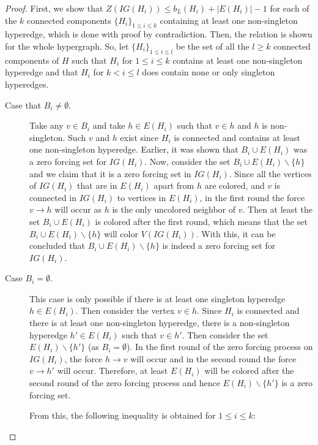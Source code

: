 \documentclass[10pt,a4paper]{amsart}
\begin{document}
\begin{proof}
    First, we show that $Z(IG(H_i)) \leq b_L(H_i) + |E(H_i)| - 1$ for each of the $k$ connected components $\{H_i\}_{1\leq i\leq k}$ containing at least one non-singleton hyperedge, which is done with proof by contradiction. Then, the relation is shown for the whole hypergraph.
    So, let $\{H_i\}_{1\leq i\leq l}$ be the set of all the $l\geq k$ connected components of $H$ such that $H_i$ for $1\leq i \leq k$ contains at least one non-singleton hyperedge and that $H_i$ for $k< i\leq l$ does contain none or only singleton hyperedges. 

    
\begin{description}
    \item[Case that $B_i\neq \emptyset$.] Take any $v\in B_i$ and take $h\in E(H_i)$ such that $v\in h$ and $h$ is non-singleton. Such $v$ and $h$ exist since $H_i$ is connected and contains at least one non-singleton hyperedge. 
    Earlier, it was shown that $B_i\cup E(H_i)$ was a zero forcing set for $IG(H_i)$. 
    Now, consider the set $B_i\cup E(H_i) \backslash \{h\}$ and we claim that it is a zero forcing set in $IG(H_i)$. 
    Since all the vertices of $IG(H_i)$ that are in $E(H_i)$ apart from $h$ are colored, and $v$ is connected in $IG(H_i)$ to vertices in $E(H_i)$, in the first round the force $v\rightarrow h$ will occur as $h$ is the only uncolored neighbor of $v$. 
    Then at least the set $B_i\cup E(H_i)$ is colored after the first round, which means that the set $B_i\cup E(H_i) \backslash \{h\}$ will color $V(IG(H_i))$.
    With this, it can be concluded that $B_i\cup E(H_i) \backslash \{h\}$ is indeed a zero forcing set for $IG(H_i)$.
    \item[Case $B_i=\emptyset$.] This case is only possible if there is at least one singleton hyperedge $h\in E(H_i)$. Then consider the vertex $v\in h$. Since $H_i$ is connected and there is at least one non-singleton hyperedge, there is a non-singleton hyperedge $h'\in E(H_i)$ such that $v\in h'$. 
    Then consider the set $E(H_i)\backslash\{h'\}$ (as $B_i=\emptyset$). In the first round of the zero forcing process on $IG(H_i)$, the force $h\rightarrow v$ will occur and in the second round the force $v\rightarrow h'$ will occur.
    Therefore, at least $E(H_i)$ will be colored after the second round of the zero forcing process and hence $E(H_i)\backslash \{h'\}$ is a zero forcing set.
    
    From this, the following inequality is obtained for $1\leq i \leq k$:
    

\end{description}
\end{proof}
\end{document}
